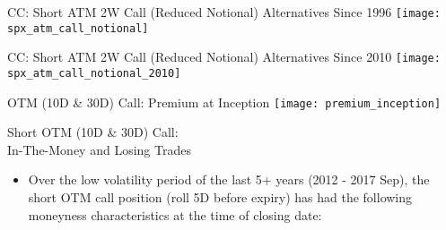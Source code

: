 \documentclass{beamer}
\begin{document}
\begin{frame}{\normalsize CC: Short ATM 2W Call (Reduced Notional) Alternatives Since 1996}
\texttt{[image: spx\_atm\_call\_notional]}
\end{frame}

\begin{frame}{\normalsize CC: Short ATM 2W Call (Reduced Notional) Alternatives Since 2010}
\texttt{[image: spx\_atm\_call\_notional\_2010]}
\end{frame}

\begin{frame}{OTM (10D \& 30D) Call: Premium at Inception}
\texttt{[image: premium\_inception]}
\end{frame}

\begin{frame}{Short OTM (10D \& 30D) Call: \\ In-The-Money and Losing Trades}
\begin{itemize}
\item Over the low volatility period of the last 5+ years (2012 - 2017 Sep), the short OTM call position (roll 5D before expiry) has had the following moneyness characteristics at the time of closing date:
\end{itemize}

\begin{table}
\centering
{}
\end{table}
\end{frame}
\end{document}
